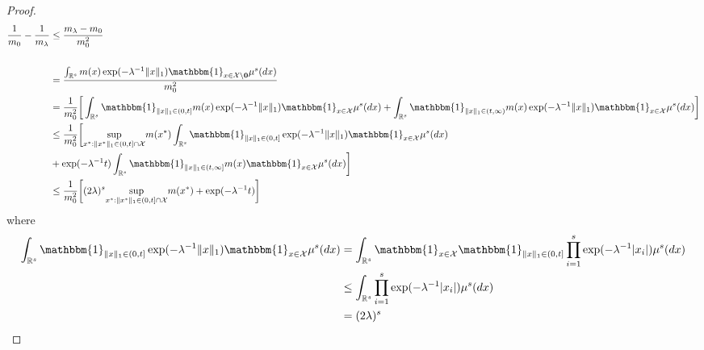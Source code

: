 \documentclass[10pt,fleqn]{article}
\newcommand{\be}{\begin{equation}\begin{aligned}}
\newcommand{\ee}{\end{aligned}\end{equation}}
\DeclareMathOperator{\1}{\mathbbm{1}}
\begin{document}
\begin{proof}[Proof]
\begin{equation}
\label{wass1}
\begin{aligned}
\frac{1}{m_0}-\frac{1}{m_\lambda} 
& \le \frac{m_\lambda -m_0}{m_0^2} \\ 
\\ &=  \frac{    \int_{\mathbb{R}^{s}}  m(x)\exp(- \lambda^{-1} \| x\|_1 )\mathbbm{1}_{x\in
\mathcal X \setminus \bf 0}\mu^{s}(d x) } {  m_0^2}  \\
&= \frac{1}{ m_0^2} \bigg[ \int_{\mathbb{R}^{s}} \mathbbm{1}_{\|x\|_1\in(0,t]}  m(x) \exp(- \lambda^{-1} \| x\|_1  )\mathbbm{1}_{x\in
\mathcal X}\mu^{s}(d x) + \int_{\mathbb{R}^{s}}
 \mathbbm{1}_{\|x\|_1\in(t,\infty)}  m(x) \exp(- \lambda^{-1} \| x\|_1  )
 \mathbbm{1}_{x\in
\mathcal X} \mu^{s}(d x) \bigg] \\
&\le \frac{1}{ m_0^2} \bigg[  \underset{x^{*}:\|x^{*}\|_1\in(0,t]\cap
\mathcal X}\sup m(x^{*}) \int_{\mathbb{R}^{s}}\mathbbm{1}_{\|x\|_1\in(0,t]}  \exp(- \lambda^{-1} \|x\|_1 )\mathbbm{1}_{x\in
\mathcal X}\mu^{s}(d x) \\ &+ \exp(- \lambda^{-1} t) \int_{\mathbb{R}^{s}}\mathbbm{1}_{\|x\|_1\in(t,\infty]}  m(x)\mathbbm{1}_{x\in
\mathcal X}\mu^{s}(d x)   \bigg] \\
&\le \frac{1}{ m_0^2} \bigg[(2\lambda)^s  \underset{x^{*}:\|x^{*}\|_1\in(0,t]\cap
\mathcal X}\sup m(x^{*})  + \exp(- \lambda^{-1} t ) \bigg] 
\end{aligned}
\end{equation}
where 
\be
\int_{\mathbb{R}^{s}}\mathbbm{1}_{\|x\|_1\in(0,t]}  \exp(- \lambda^{-1} \|x\|_1 )\mathbbm{1}_{x\in
\mathcal X}\mu^{s}(d x)  &= \int_{\mathbb{R}^{s}} \mathbbm{1}_{x\in
\mathcal X}\mathbbm{1}_{\|x\|_1\in(0,t]} \prod_{i=1}^s \exp(- \lambda^{-1} |x_i| )\mu^{s}(d x) \\
&\le   \int_{\mathbb{R}^{s}} \prod_{i=1}^s \exp(- \lambda^{-1} |x_i| )\mu^{s}(d x) \\
&=   (2\lambda)^s \\
\ee


\end{proof}
\end{document}
